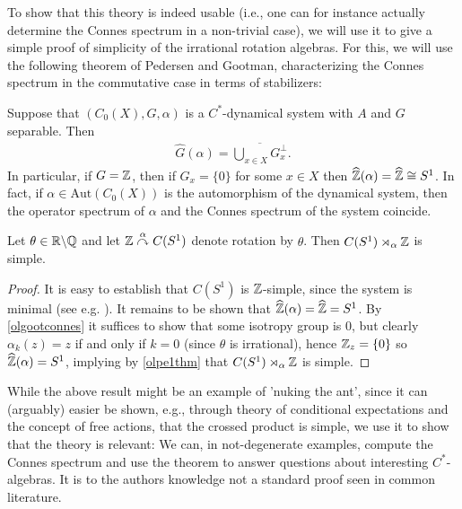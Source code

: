 To show that this theory is indeed usable (i.e., one can for instance actually determine the Connes spectrum in a non-trivial case), we will use it to give a simple proof of simplicity of the irrational rotation algebras. For this, we will use the following theorem of Pedersen and Gootman, characterizing the Connes spectrum in the commutative case in terms of stabilizers:
\begin{theorem}
	Suppose that $(C_0(X),G,\alpha)$ is a $C^*$-dynamical system with $A$ and $G$ separable. Then
	\begin{align*}
		\hat G(\alpha) = \overline{\bigcup_{x \in X} G_x^\perp}.
	\end{align*}
	 In particular, if $G = \mathbb{Z}$, then if $G_x=\{0\}$ for some $x \in X$ then $\widehat{\mathbb{Z}}(\alpha) = \widehat{\mathbb{Z}} \cong S^1$. In fact, if $\alpha \in \mathrm{Aut}(C_0(X))$ is the automorphism of the dynamical system, then the operator spectrum of $\alpha$ and the Connes spectrum of the system coincide.
	\label{olgootconnes}
\end{theorem}
\begin{example}
	Let $\theta \in \mathbb{R} \backslash \mathbb{Q}$ and let $\mathbb{Z} \stackrel{\alpha}{\curvearrowright} C(S^1)$ denote rotation by $\theta$. Then $C(S^1) \rtimes_\alpha \mathbb{Z}$ is simple.
\end{example}
\begin{proof}
	It is easy to establish that $C(S^1)$ is $\mathbb{Z}$-simple, since the system is minimal (see e.g.  \cite[5.2]{glasner1976proximal}). It remains to be shown that $\widehat{\mathbb{Z}}(\alpha) = \widehat{\mathbb{Z}} = S^1$. By \cref{olgootconnes} it suffices to show that some isotropy group is $0$, but clearly $\alpha_k(z) = z$ if and only if $k = 0$ (since $\theta$ is irrational), hence $\mathbb{Z}_{z} = \{0\}$ so $\widehat{\mathbb{Z}} (\alpha) = S^1$, implying by \cref{olpe1thm} that $C(S^1) \rtimes_\alpha \mathbb{Z}$ is simple.
\end{proof}
While the above result might be an example of 'nuking the ant', since it can (arguably) easier be shown, e.g., through theory of conditional expectations and the concept of free actions, that the crossed product is simple, we use it to show that the theory is relevant: We can, in not-degenerate examples, compute the Connes spectrum and use the theorem to answer questions about interesting $C^*$-algebras. It is to the authors knowledge not a standard proof seen in common literature.
